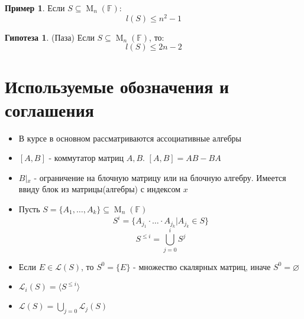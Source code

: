 \documentclass[a4paper, 14pt]{extarticle}
\theoremstyle{definition}
\newtheorem{example}{Пример}
\newtheorem{hypot}{Гипотеза}
\begin{document}
\begin{example}
	Если \(S \subseteq \operatorname{M}_n(\mathbb{F}):\) \[l(S) \leqslant n^2 - 1\]
\end{example}

\begin{hypot}
	(Паза) Если \(S \subseteq \operatorname{M}_n(\mathbb{F})\), то: \[l(S) \leqslant 2n - 2\]
\end{hypot}

\newpage
\section{Используемые обозначения и соглашения}

\begin{itemize}
	\item В курсе в основном рассматриваются ассоциативные алгебры
	\item \([A, B]\) - коммутатор матриц \(A, B\). \([A, B] = AB - BA\)
	\item \(B \left|_{x} \right.\) - ограничение на блочную матрицу или на блочную алгебру. Имеется ввиду блок из матрицы(алгебры) с индексом \(x\)
	\item Пусть \(S = \{A_1, \dots, A_k\} \subseteq \operatorname{M}_n(\mathbb{F})\)
	\[S^i = \{A_{j_1} \cdot \dots \cdot A_{j_k} | A_{j_k} \in S\}\]
	\[S^{\leqslant i} = \bigcup\limits_{j = 0}^i S^{j}\]
	\item Если \(E \in \mathcal{L}(S)\), то \(S^0 = \{E\}\) - множество скалярных матриц, иначе \(S^0 = \varnothing\)
	\item \(\mathcal{L}_i(S) = \langle S^{\leqslant i} \rangle\)
	\item \(\mathcal{L}(S) = \bigcup\limits_{j = 0} \mathcal{L}_j(S)\)
\end{itemize}
\end{document}
